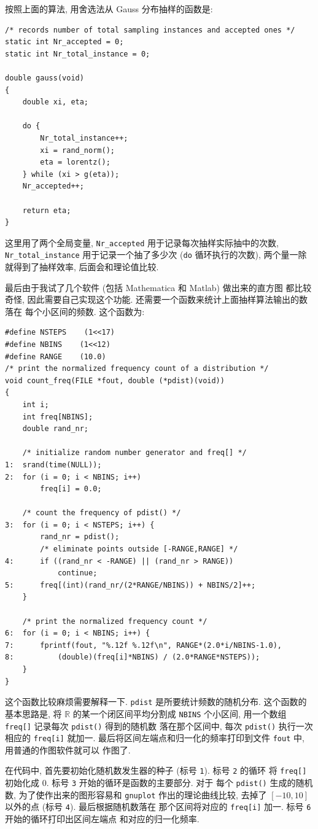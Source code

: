 \documentclass{ctexart}
\begin{document}
按照上面的算法, 用舍选法从 Gauss 分布抽样的函数是:
\begin{verbatim}
/* records number of total sampling instances and accepted ones */
static int Nr_accepted = 0;
static int Nr_total_instance = 0;

double gauss(void)
{
    double xi, eta;

    do {
        Nr_total_instance++;
        xi = rand_norm();
        eta = lorentz();
    } while (xi > g(eta));
    Nr_accepted++;

    return eta;
}
\end{verbatim}
这里用了两个全局变量, \verb|Nr_accepted| 用于记录每次抽样实际抽中的次数,
\verb|Nr_total_instance| 用于记录一个抽了多少次 (\verb|do| 循环执行的次数),
两个量一除就得到了抽样效率, 后面会和理论值比较.

最后由于我试了几个软件 (包括 Mathematica 和 Matlab) 做出来的直方图
都比较奇怪, 因此需要自己实现这个功能. 还需要一个函数来统计上面抽样算法输出的数落在
每个小区间的频数. 这个函数为:
\begin{verbatim}
#define NSTEPS    (1<<17)
#define NBINS    (1<<12)
#define RANGE    (10.0)
/* print the normalized frequency count of a distribution */
void count_freq(FILE *fout, double (*pdist)(void))
{
    int i;
    int freq[NBINS];
    double rand_nr;

    /* initialize random number generator and freq[] */
1:  srand(time(NULL));
2:  for (i = 0; i < NBINS; i++)
        freq[i] = 0.0;

    /* count the frequency of pdist() */
3:  for (i = 0; i < NSTEPS; i++) {
        rand_nr = pdist();
        /* eliminate points outside [-RANGE,RANGE] */
4:      if ((rand_nr < -RANGE) || (rand_nr > RANGE))
            continue;
5:      freq[(int)(rand_nr/(2*RANGE/NBINS)) + NBINS/2]++;
    }

    /* print the normalized frequency count */
6:  for (i = 0; i < NBINS; i++) {
7:      fprintf(fout, "%.12f %.12f\n", RANGE*(2.0*i/NBINS-1.0),
8:          (double)(freq[i]*NBINS) / (2.0*RANGE*NSTEPS));
    }
}
\end{verbatim}
这个函数比较麻烦需要解释一下. \verb|pdist| 是所要统计频数的随机分布.
这个函数的基本思路是, 将 $\mathbb{R}$ 的某一个闭区间平均分割成 \verb|NBINS|
个小区间, 用一个数组 \verb|freq[]| 记录每次 \verb|pdist()| 得到的随机数
落在那个区间中, 每次 \verb|pdist()| 执行一次相应的 \verb|freq[i]| 就加一.
最后将区间左端点和归一化的频率打印到文件 \verb|fout| 中, 用普通的作图软件就可以
作图了.

在代码中, 首先要初始化随机数发生器的种子 (标号 \verb|1|). 标号 \verb|2| 的循环
将 \verb|freq[]| 初始化成 0. 标号 \verb|3| 开始的循环是函数的主要部分. 对于
每个 \verb|pdist()| 生成的随机数, 为了使作出来的图形容易和 \verb|gnuplot|
作出的理论曲线比较, 去掉了 $[-10,10]$ 以外的点 (标号 \verb|4|). 最后根据随机数落在
那个区间将对应的 \verb|freq[i]| 加一. 标号 \verb|6| 开始的循环打印出区间左端点
和对应的归一化频率.
\end{document}

